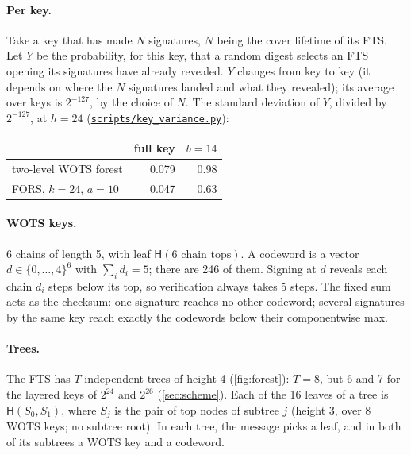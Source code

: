\documentclass[11pt]{article}
\newcommand{\hash}{\mathsf{H}}
\begin{document}
\paragraph{Per key.} Take a key that has made $N$ signatures, $N$ being the cover lifetime of its FTS. Let $Y$ be
the probability, for this key, that a random digest selects an FTS opening its signatures have already revealed. $Y$
changes from key to key (it depends on where the $N$ signatures landed and what they revealed); its average over
keys is $2^{-127}$, by the choice of $N$. The standard deviation of $Y$, divided by $2^{-127}$, at $h=24$
(\href{https://github.com/TomWambsgans/sphincs.art/blob/main/scripts/key_variance.py}{\texttt{scripts/key\_variance.py}}):
\begin{center}
\begin{tabular}{lrr}
  \toprule
  & full key & $b=14$ \\
  \midrule
  two-level WOTS forest & 0.079 & 0.98 \\
  FORS, $k=24$, $a=10$ & 0.047 & 0.63 \\
  \bottomrule
\end{tabular}
\end{center}

\paragraph{WOTS keys.} 6 chains of length 5, with leaf $\hash(\text{6 chain tops})$. A codeword is a vector
$d\in\{0,\dots,4\}^6$ with $\sum_i d_i=5$; there are 246 of them. Signing at $d$ reveals each chain $d_i$ steps below
its top, so verification always takes 5 steps. The fixed sum acts as the checksum: one signature reaches no other
codeword; several signatures by the same key reach exactly the codewords below their componentwise max.

\paragraph{Trees.} The FTS has $T$ independent trees of height 4 (\cref{fig:forest}): $T=8$, but 6 and 7 for the
layered keys of $2^{24}$ and $2^{26}$ (\cref{sec:scheme}). Each of the 16 leaves of a tree
is $\hash(S_0,S_1)$, where $S_j$ is the pair of top nodes of subtree $j$ (height 3, over 8 WOTS keys; no subtree root).
In each tree, the message picks a leaf, and in both of its subtrees a WOTS key and a codeword.
\end{document}

